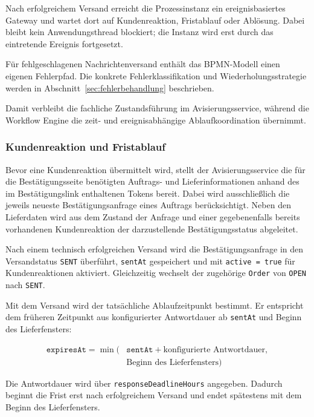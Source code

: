 \documentclass[
  12pt,
  a4paper,
  oneside
]{article}
\begin{document}
Nach erfolgreichem Versand erreicht die Prozessinstanz ein ereignisbasiertes
Gateway und wartet dort auf Kundenreaktion, Fristablauf oder Ablösung. Dabei
bleibt kein Anwendungsthread blockiert; die Instanz wird erst durch das
eintretende Ereignis fortgesetzt.

Für fehlgeschlagenen Nachrichtenversand enthält das BPMN-Modell einen eigenen
Fehlerpfad. Die konkrete Fehlerklassifikation und Wiederholungsstrategie werden
in Abschnitt~\ref{sec:fehlerbehandlung} beschrieben.

Damit verbleibt die fachliche Zustandsführung im Avisierungsservice, während
die Workflow Engine die zeit- und ereignisabhängige Ablaufkoordination
übernimmt.

\subsubsection{Kundenreaktion und Fristablauf}
\label{sec:kundenreaktion-fristablauf}

Bevor eine Kundenreaktion übermittelt wird, stellt der Avisierungsservice die
für die Bestätigungsseite benötigten Auftrags- und Lieferinformationen anhand
des im Bestätigungslink enthaltenen Tokens bereit. Dabei wird ausschließlich
die jeweils neueste Bestätigungsanfrage eines Auftrags berücksichtigt.
Neben den Lieferdaten wird aus dem Zustand der Anfrage und einer gegebenenfalls
bereits vorhandenen Kundenreaktion der darzustellende Bestätigungsstatus
abgeleitet.

Nach einem technisch erfolgreichen Versand wird die Bestätigungsanfrage in
den Versandstatus \texttt{SENT} überführt, \texttt{sentAt} gespeichert und mit
\texttt{active = true} für Kundenreaktionen aktiviert. Gleichzeitig wechselt
der zugehörige \texttt{Order} von \texttt{OPEN} nach \texttt{SENT}.

Mit dem Versand wird der tatsächliche Ablaufzeitpunkt bestimmt. Er entspricht
dem früheren Zeitpunkt aus konfigurierter Antwortdauer ab
\texttt{sentAt} und Beginn des Lieferfensters:

\[
\begin{aligned}
	\texttt{expiresAt}
	= \min\!\bigl(
	&\texttt{sentAt} + \text{konfigurierte Antwortdauer}, \\
	&\text{Beginn des Lieferfensters}
	\bigr)
\end{aligned}
\]

Die Antwortdauer wird über \texttt{responseDeadlineHours} angegeben. Dadurch
beginnt die Frist erst nach erfolgreichem Versand und endet spätestens mit dem
Beginn des Lieferfensters.
\end{document}
